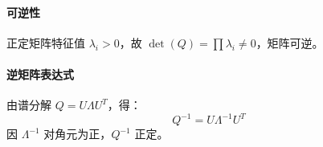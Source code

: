 \paragraph{可逆性}  
正定矩阵特征值 \( \lambda_i > 0 \)，故 \( \det(Q) = \prod \lambda_i \neq 0 \)，矩阵可逆。

\paragraph{逆矩阵表达式}  
由谱分解 \( Q = U \Lambda U^T \)，得：
\[
Q^{-1} = U \Lambda^{-1} U^T
\]
因 \( \Lambda^{-1} \) 对角元为正，\( Q^{-1} \) 正定。